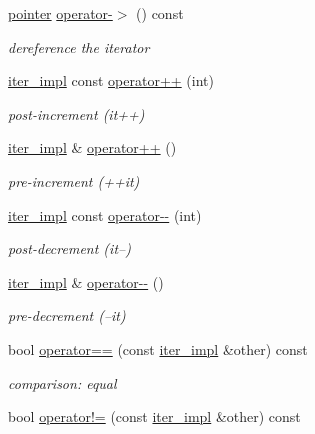 \begin{DoxyCompactItemize}
\hyperlink{classnlohmann_1_1detail_1_1iter__impl_a69e52f890ce8c556fd68ce109e24b360}{pointer} \hyperlink{classnlohmann_1_1detail_1_1iter__impl_a6da3d2b34528aff328f3dcb513076dec}{operator-\/$>$} () const
\begin{DoxyCompactList}\small\item\em dereference the iterator \end{DoxyCompactList}\item 
\hyperlink{classnlohmann_1_1detail_1_1iter__impl}{iter\+\_\+impl} const \hyperlink{classnlohmann_1_1detail_1_1iter__impl_a7d2397773b2dce42f30f0375a6a1d850}{operator++} (int)
\begin{DoxyCompactList}\small\item\em post-\/increment (it++) \end{DoxyCompactList}\item 
\hyperlink{classnlohmann_1_1detail_1_1iter__impl}{iter\+\_\+impl} \& \hyperlink{classnlohmann_1_1detail_1_1iter__impl_abdfe2a7f464400a7ab572782d14b922f}{operator++} ()
\begin{DoxyCompactList}\small\item\em pre-\/increment (++it) \end{DoxyCompactList}\item 
\hyperlink{classnlohmann_1_1detail_1_1iter__impl}{iter\+\_\+impl} const \hyperlink{classnlohmann_1_1detail_1_1iter__impl_a1fc43e764467b8ea4a4cdd01f629d757}{operator-\/-\/} (int)
\begin{DoxyCompactList}\small\item\em post-\/decrement (it--) \end{DoxyCompactList}\item 
\hyperlink{classnlohmann_1_1detail_1_1iter__impl}{iter\+\_\+impl} \& \hyperlink{classnlohmann_1_1detail_1_1iter__impl_a84e689fb581d651d130039f7cb81494a}{operator-\/-\/} ()
\begin{DoxyCompactList}\small\item\em pre-\/decrement (--it) \end{DoxyCompactList}\item 
bool \hyperlink{classnlohmann_1_1detail_1_1iter__impl_a2b592605b63ae7f5401996ffa3b14393}{operator==} (const \hyperlink{classnlohmann_1_1detail_1_1iter__impl}{iter\+\_\+impl} \&other) const
\begin{DoxyCompactList}\small\item\em comparison\+: equal \end{DoxyCompactList}\item 
bool \hyperlink{classnlohmann_1_1detail_1_1iter__impl_aeab0e2b5da70b3bdebecd5b1a6ee66a6}{operator!=} (const \hyperlink{classnlohmann_1_1detail_1_1iter__impl}{iter\+\_\+impl} \&other) const

\end{DoxyCompactItemize}
